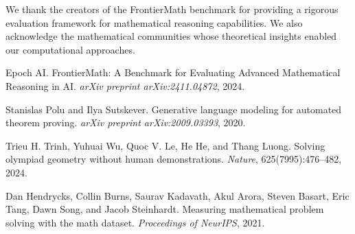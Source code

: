 \documentclass[11pt]{article}
\begin{document}
We thank the creators of the FrontierMath benchmark for providing a rigorous evaluation framework for mathematical reasoning capabilities. We also acknowledge the mathematical communities whose theoretical insights enabled our computational approaches.


\begin{thebibliography}{9}

Epoch AI.
\newblock FrontierMath: A Benchmark for Evaluating Advanced Mathematical Reasoning in AI.
\newblock \emph{arXiv preprint arXiv:2411.04872}, 2024.

Stanislas Polu and Ilya Sutskever.
\newblock Generative language modeling for automated theorem proving.
\newblock \emph{arXiv preprint arXiv:2009.03393}, 2020.

Trieu H. Trinh, Yuhuai Wu, Quoc V. Le, He He, and Thang Luong.
\newblock Solving olympiad geometry without human demonstrations.
\newblock \emph{Nature}, 625(7995):476--482, 2024.

Dan Hendrycks, Collin Burns, Saurav Kadavath, Akul Arora, Steven Basart, Eric Tang, Dawn Song, and Jacob Steinhardt.
\newblock Measuring mathematical problem solving with the math dataset.
\newblock \emph{Proceedings of NeurIPS}, 2021.

\end{thebibliography}
\end{document}
